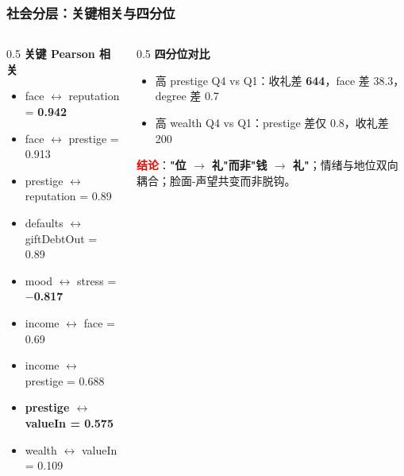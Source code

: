 \documentclass[AutoFakeBold,AutoFakeSlant]{beamer}
\begin{document}
\begin{frame}
    \frametitle{社会分层：关键相关与四分位}
    \scriptsize
    \begin{columns}
        \begin{column}{0.5\textwidth}
            \textbf{关键 Pearson 相关}
            \begin{itemize}
                \item face $\leftrightarrow$ reputation = \textbf{0.942}
                \item face $\leftrightarrow$ prestige = 0.913
                \item prestige $\leftrightarrow$ reputation = 0.89
                \item defaults $\leftrightarrow$ giftDebtOut = 0.89
                \item mood $\leftrightarrow$ stress = \textbf{$-$0.817}
                \item income $\leftrightarrow$ face = 0.69
                \item income $\leftrightarrow$ prestige = 0.688
                \item \textbf{prestige $\leftrightarrow$ valueIn = 0.575}
                \item wealth $\leftrightarrow$ valueIn = 0.109
            \end{itemize}
        \end{column}
        \begin{column}{0.5\textwidth}
            \textbf{四分位对比}
            \begin{itemize}
                \item 高 prestige Q4 vs Q1：收礼差 \textbf{644}，face 差 38.3，degree 差 0.7
                \item 高 wealth Q4 vs Q1：prestige 差仅 0.8，收礼差 200
            \end{itemize}
            \vspace{0.3em}
            \textcolor{red}{\textbf{结论}}：\textbf{"位 $\to$ 礼"而非"钱 $\to$ 礼"}；情绪与地位双向耦合；脸面-声望共变而非脱钩。
        \end{column}
    \end{columns}
\end{frame}
\end{document}
